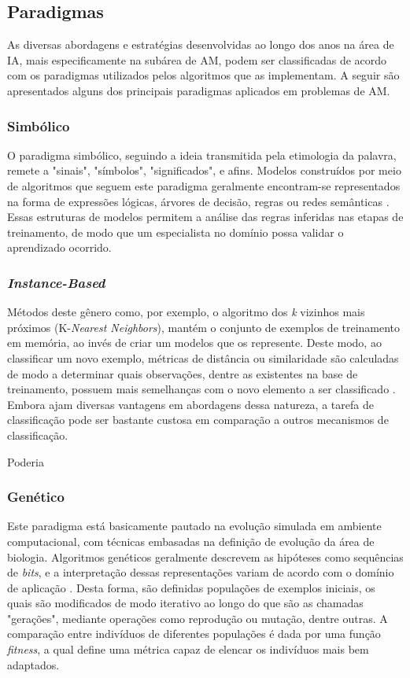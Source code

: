\subsection{Paradigmas}
\label{Sec:paradigmas}

As diversas abordagens e estratégias desenvolvidas ao longo dos anos na área de IA, mais especificamente na subárea de AM, podem ser classificadas de acordo com os paradigmas utilizados pelos algoritmos que as implementam. A seguir são apresentados alguns dos principais paradigmas aplicados em problemas de AM.

\subsubsection{Simbólico}

O paradigma simbólico, seguindo a ideia transmitida pela etimologia da palavra, remete a "sinais", "símbolos", "significados", e afins. Modelos construídos por meio de algoritmos que seguem este paradigma geralmente encontram-se representados na forma de expressões lógicas, árvores de decisão, regras ou redes semânticas \cite{maletzke2009}. Essas estruturas de modelos permitem a análise das regras inferidas nas etapas de treinamento, de modo que um especialista no domínio possa validar o aprendizado ocorrido.

\subsubsection{\textit{Instance-Based}}

Métodos deste gênero como, por exemplo, o algoritmo dos \emph{k} vizinhos mais próximos (K-\textit{Nearest Neighbors}), mantém o conjunto de exemplos de treinamento em memória, ao invés de criar um modelos que os represente. Deste modo, ao classificar um novo exemplo, métricas de distância ou similaridade são calculadas de modo a determinar quais observações, dentre as existentes na base de treinamento, possuem mais semelhanças com o novo elemento a ser classificado \cite{mitchell1997}. Embora ajam diversas vantagens em abordagens dessa natureza, a tarefa de classificação pode ser bastante custosa em comparação a outros mecanismos de classificação.

Poderia


\subsubsection{Genético}

Este paradigma está basicamente pautado na evolução simulada em ambiente computacional, com técnicas embasadas na definição de evolução da área de biologia. Algoritmos genéticos geralmente descrevem as hipóteses como sequências de \textit{bits}, e a interpretação dessas representações variam de acordo com o domínio de aplicação \cite{mitchell1997}. Desta forma, são definidas populações de exemplos iniciais, os quais são modificados de modo iterativo ao longo do que são as chamadas "gerações", mediante operações como reprodução ou mutação, dentre outras. A comparação entre indivíduos de diferentes populações é dada por uma função \textit{fitness}, a qual define uma métrica capaz de elencar os indivíduos mais bem adaptados.

